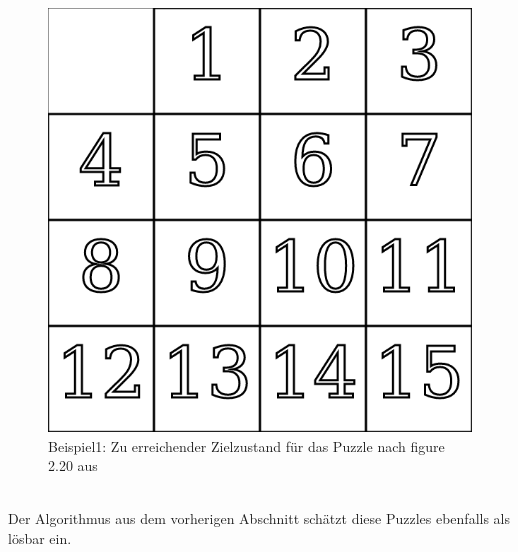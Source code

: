 \begin{minipage}{\linewidth}
\begin{minipage}[t]{0.45\linewidth}
\begin{figure}[H]
			\includegraphics[width=\linewidth,keepaspectratio]{img/End_Puzzle_Stroetmann.png}
			\captionsetup{format=plain, indention=0pt}
			\caption{\label{fig:Ex1_end}Beispiel1: Zu erreichender Zielzustand für das Puzzle nach figure 2.20 aus \autocite{github-stroetmann:online}}
		\end{figure}
	\end{minipage}
\end{minipage}\\\WNL%
Der Algorithmus aus dem vorherigen Abschnitt schätzt diese Puzzles ebenfalls als lösbar ein.\\
